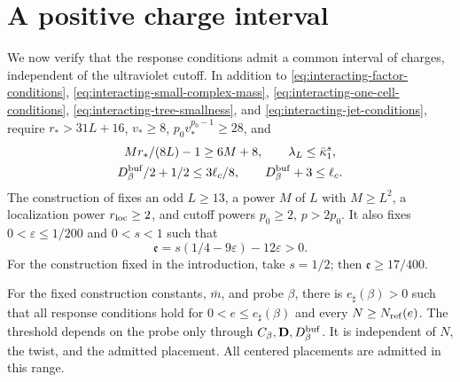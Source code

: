 \section{A positive charge interval}
\label{subsec:interacting-positive-threshold}

We now verify that the response conditions admit
a common interval of charges, independent of the
ultraviolet cutoff. In addition to
\eqref{eq:interacting-factor-conditions},
\eqref{eq:interacting-small-complex-mass},
\eqref{eq:interacting-one-cell-conditions},
\eqref{eq:interacting-tree-smallness}, and
\eqref{eq:interacting-jet-conditions}, require
$r_*>31L+16$, $v_*\ge8$, $p_0v_*^{p_0-1}\ge28$, and
\begin{gather}
 Mr_*/(8L)-1\ge6M+8,\qquad
 \lambda_L\le\bar\kappa_1^s,
                                  \label{eq:interacting-last-response-conditions}\\
 D_\beta^{\rm buf}/2+1/2\le3\ell_c/8,\qquad
 D_\beta^{\rm buf}+3\le\ell_c .
                                  \label{eq:interacting-placement-conditions}
\end{gather}
The construction of \cite[\S6.1]{CoverTuning}
fixes an odd $L\ge13$, a power
$M$ of $L$ with $M\ge L^2$, a localization
power $r_{\rm loc}\ge2$, and cutoff powers
$p_0\ge2$, $p>2p_0$. It also fixes
$0<\varepsilon\le1/200$ and $0<s<1$ such that
\begin{equation}\label{eq:interacting-response-exponents}
 \mathfrak e=s(1/4-9\varepsilon)-12\varepsilon>0.
\end{equation}
For the construction fixed in the introduction, take $s=1/2$;
then $\mathfrak e\ge17/400$.

\begin{proposition}\label{prop:interacting-positive-threshold}
For the fixed construction constants, $\bar m$,
and probe $\beta$, there is $e_\sharp(\beta)>0$
such that all response conditions hold for
$0<e\le e_\sharp(\beta)$ and every
$N\ge N_{\rm ref}(e)$. The threshold depends
on the probe only through
$C_\beta,\mathbf D,D_\beta^{\rm buf}$.
It is independent of $N$, the twist, and the
admitted placement. All centered placements
are admitted in this range.
\end{proposition}


